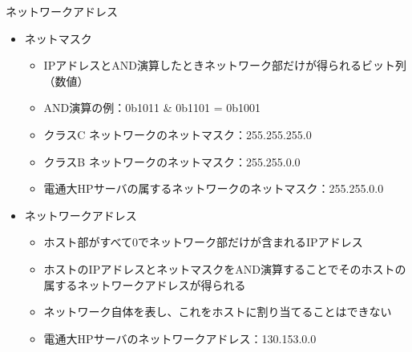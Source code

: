 \documentclass[12pt,aspectratio=169]{beamer}
\begin{document}
\begin{frame}{ネットワークアドレス}

  \begin{itemize}
    \item ネットマスク
      \begin{itemize}
        \item IPアドレスとAND演算したときネットワーク部だけが得られるビット列（数値）
        \item AND演算の例：0b1011 \& 0b1101 = 0b1001
        \item クラスC ネットワークのネットマスク：255.255.255.0
        \item クラスB ネットワークのネットマスク：255.255.0.0
        \item 電通大HPサーバの属するネットワークのネットマスク：255.255.0.0
      \end{itemize}

    \item ネットワークアドレス
      \begin{itemize}
        \item ホスト部がすべて0でネットワーク部だけが含まれるIPアドレス
        \item ホストのIPアドレスとネットマスクをAND演算することでそのホストの属するネットワークアドレスが得られる
        \item ネットワーク自体を表し、これをホストに割り当てることはできない
        \item 電通大HPサーバのネットワークアドレス：130.153.0.0
      \end{itemize}

  \end{itemize}

\end{frame}
\end{document}
